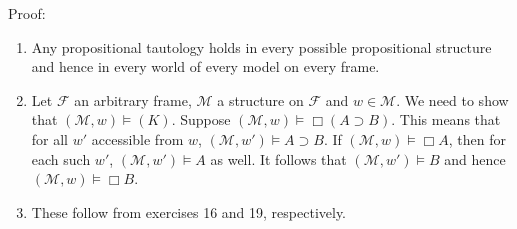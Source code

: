 \documentclass[a4paper,10pt]{article}
\newcommand{\imp}{\supset}
\newcommand{\F}{\mathcal{F}}
\newcommand{\M}{\mathcal{M}}
\theoremstyle{definition}
\begin{document}
Proof:
\begin{enumerate}
 \item Any propositional tautology holds in every possible propositional structure and hence in every world of every model on every frame.
 \item Let $\F$ an arbitrary frame, $\M$ a structure on $\F$ and $w \in \M$. We need to show that $(\M, w) \models (K)$. Suppose $(\M, w) \models \Box(A\imp B)$. This means that for all $w'$ accessible from $w$, $(\M, w') \models A \imp B$. If $(\M, w) \models \Box A$, then for each such $w'$, $(\M, w') \models A$ as well. It follows that $(\M, w') \models B$ and hence $(\M, w) \models \Box B$.
 \item These follow from exercises 16 and 19, respectively.
\end{enumerate}
\end{document}
